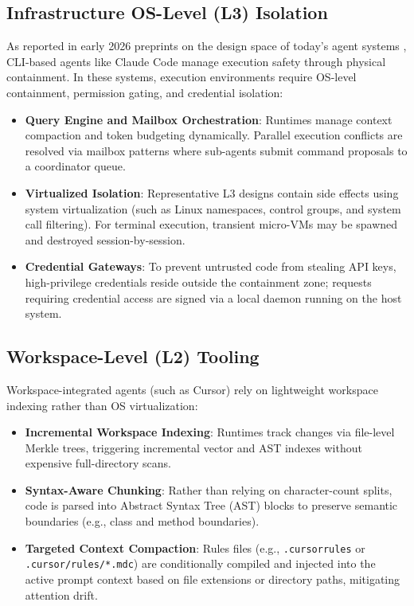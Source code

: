 \documentclass[10pt,journal,compsoc]{IEEEtran}
\begin{document}
\subsection{Infrastructure OS-Level (L3) Isolation}
As reported in early 2026 preprints on the design space of today's agent systems \cite{liu2026}, CLI-based agents like Claude Code manage execution safety through physical containment. In these systems, execution environments require OS-level containment, permission gating, and credential isolation:
\begin{itemize}
  \item \textbf{Query Engine and Mailbox Orchestration}: Runtimes manage context compaction and token budgeting dynamically. Parallel execution conflicts are resolved via mailbox patterns where sub-agents submit command proposals to a coordinator queue.
  \item \textbf{Virtualized Isolation}: Representative L3 designs contain side effects using system virtualization (such as Linux namespaces, control groups, and system call filtering). For terminal execution, transient micro-VMs may be spawned and destroyed session-by-session.
  \item \textbf{Credential Gateways}: To prevent untrusted code from stealing API keys, high-privilege credentials reside outside the containment zone; requests requiring credential access are signed via a local daemon running on the host system.
\end{itemize}

\subsection{Workspace-Level (L2) Tooling}
Workspace-integrated agents (such as Cursor) rely on lightweight workspace indexing rather than OS virtualization:
\begin{itemize}
  \item \textbf{Incremental Workspace Indexing}: Runtimes track changes via file-level Merkle trees, triggering incremental vector and AST indexes without expensive full-directory scans.
  \item \textbf{Syntax-Aware Chunking}: Rather than relying on character-count splits, code is parsed into Abstract Syntax Tree (AST) blocks to preserve semantic boundaries (e.g., class and method boundaries).
  \item \textbf{Targeted Context Compaction}: Rules files (e.g., \texttt{.cursorrules} or \texttt{.cursor/rules/*.mdc}) are conditionally compiled and injected into the active prompt context based on file extensions or directory paths, mitigating attention drift.
\end{itemize}
\end{document}
